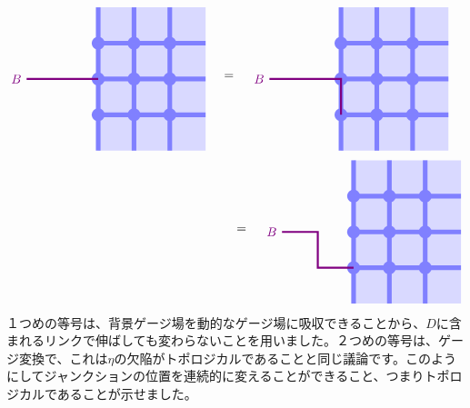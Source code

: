 \documentclass[report,paper=a4, fontsize=12pt, line_length=16cm, number_of_lines=33,dvipdfmx]{jlreq}
\numberwithin{equation}{chapter}
\begin{document}
\begin{align}
  \begin{tikzpicture}[baseline=0cm]
      \foreach \x in {0,1,2}{
          \foreach \y in {-2,-1,...,1}{
          \fill[plaqblue](\x,\y) rectangle (\x+1,\y+1);
          }
      }
      \foreach \x in {0,1,2}{
          \foreach \y in {-1,0,1}{
              \fill[linkblue] (\x,\y) circle (1.8mm);
          }
      }
      \foreach \x in {0,1,2}{
          \foreach \y in {-1,0,1}{
              \draw[linkblue, line width = 1.3mm](\x,\y)--(\x + 1,\y);
          }
      }
      \foreach \x in {0,1,2}{
          \foreach \y in {-2,-1,...,1}{
              \draw[linkblue, line width = 1.3mm](\x,\y)--(\x,\y + 1);
          }
      }
      \draw[red!50!blue, ultra thick](0,0)--(-2,0) node[left]{$B$};
  \end{tikzpicture}
  \quad = \quad
  \begin{tikzpicture}[baseline=0cm]
      \foreach \x in {0,1,2}{
          \foreach \y in {-2,-1,...,1}{
          \fill[plaqblue](\x,\y) rectangle (\x+1,\y+1);
          }
      }
      \foreach \x in {0,1,2}{
          \foreach \y in {-1,0,1}{
              \fill[linkblue] (\x,\y) circle (1.8mm);
          }
      }
      \foreach \x in {0,1,2}{
          \foreach \y in {-1,0,1}{
              \draw[linkblue, line width = 1.3mm](\x,\y)--(\x + 1,\y);
          }
      }
      \foreach \x in {0,1,2}{
          \foreach \y in {-2,-1,...,1}{
              \draw[linkblue, line width = 1.3mm](\x,\y)--(\x,\y + 1);
          }
      }
      \draw[red!50!blue, ultra thick](0,-1)--(0,0)--(-2,0) node[left]{$B$};
  \end{tikzpicture}    
  \quad \notag \\= \quad
  \begin{tikzpicture}[baseline=0cm]
      \foreach \x in {0,1,2}{
          \foreach \y in {-2,-1,...,1}{
          \fill[plaqblue](\x,\y) rectangle (\x+1,\y+1);
          }
      }
      \foreach \x in {0,1,2}{
          \foreach \y in {-1,0,1}{
              \fill[linkblue] (\x,\y) circle (1.8mm);
          }
      }
      \foreach \x in {0,1,2}{
          \foreach \y in {-1,0,1}{
              \draw[linkblue, line width = 1.3mm](\x,\y)--(\x + 1,\y);
          }
      }
      \foreach \x in {0,1,2}{
          \foreach \y in {-2,-1,...,1}{
              \draw[linkblue, line width = 1.3mm](\x,\y)--(\x,\y + 1);
          }
      }
      \draw[red!50!blue, ultra thick](0,-1)--(-1,-1)--(-1,0)--(-2,0) node[left]{$B$};
  \end{tikzpicture}
  \label{topologicaljunctionB}
\end{align}
１つめの等号は、背景ゲージ場を動的なゲージ場に吸収できることから、$D$に含まれるリンクで伸ばしても変わらないことを用いました。２つめの等号は、ゲージ変換で、これは$\eta$の欠陥がトポロジカルであることと同じ議論です。このようにしてジャンクションの位置を連続的に変えることができること、つまりトポロジカルであることが示せました。
\end{document}
